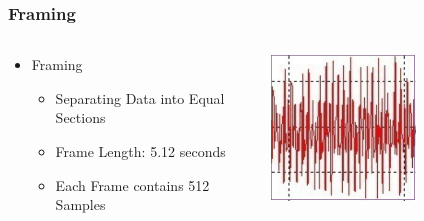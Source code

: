 \documentclass{beamer}
\begin{document}
\begin{frame}
  \frametitle{Framing}
  \begin{columns}
  \begin{column}{0.65\textwidth}
  \begin{itemize}
  	\item Framing
  	\begin{itemize}
  		\item Separating Data into Equal Sections    
  		\linebreak
  		\item Frame Length: 5.12 seconds       
  		\linebreak
  		\item Each Frame contains 512 Samples                 
  	\end{itemize}
  \end{itemize}
  \end{column}
  \begin{column}{0.6\textwidth}
   \includegraphics[width=0.6\textwidth]{Illustrations/rawgaitdata.png}
       \\
  \end{column}
  \end{columns}
\end{frame}
\end{document}
